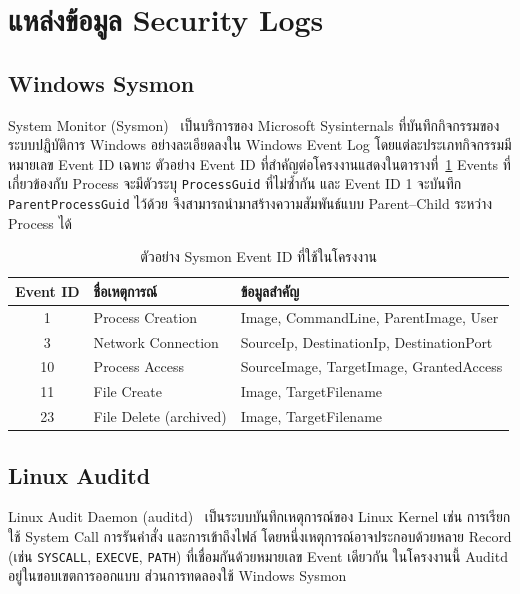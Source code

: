 \section{แหล่งข้อมูล Security Logs}

\subsection{Windows Sysmon}
System Monitor (Sysmon)~\cite{sysmon} เป็นบริการของ Microsoft Sysinternals
ที่บันทึกกิจกรรมของระบบปฏิบัติการ Windows อย่างละเอียดลงใน Windows Event Log
โดยแต่ละประเภทกิจกรรมมีหมายเลข Event ID เฉพาะ ตัวอย่าง Event ID ที่สำคัญต่อโครงงานแสดงในตารางที่~\ref{tab:sysmon-eid}
Events ที่เกี่ยวข้องกับ Process จะมีตัวระบุ \texttt{ProcessGuid} ที่ไม่ซ้ำกัน
และ Event ID 1 จะบันทึก \texttt{ParentProcessGuid} ไว้ด้วย
จึงสามารถนำมาสร้างความสัมพันธ์แบบ Parent--Child ระหว่าง Process ได้

\begin{table}[ht]
  \centering
  \caption{ตัวอย่าง Sysmon Event ID ที่ใช้ในโครงงาน}
  \label{tab:sysmon-eid}
  \begin{tabular}{|c|l|l|}
    \hline
    \textbf{Event ID} & \textbf{ชื่อเหตุการณ์} & \textbf{ข้อมูลสำคัญ} \\ \hline
    1  & Process Creation        & Image, CommandLine, ParentImage, User \\ \hline
    3  & Network Connection      & SourceIp, DestinationIp, DestinationPort \\ \hline
    10 & Process Access          & SourceImage, TargetImage, GrantedAccess \\ \hline
    11 & File Create             & Image, TargetFilename \\ \hline
    23 & File Delete (archived)  & Image, TargetFilename \\ \hline
  \end{tabular}
\end{table}

\subsection{Linux Auditd}
Linux Audit Daemon (auditd)~\cite{auditd} เป็นระบบบันทึกเหตุการณ์ของ Linux Kernel
เช่น การเรียกใช้ System Call การรันคำสั่ง และการเข้าถึงไฟล์
โดยหนึ่งเหตุการณ์อาจประกอบด้วยหลาย Record (เช่น \texttt{SYSCALL}, \texttt{EXECVE}, \texttt{PATH})
ที่เชื่อมกันด้วยหมายเลข Event เดียวกัน
ในโครงงานนี้ Auditd อยู่ในขอบเขตการออกแบบ ส่วนการทดลองใช้ Windows Sysmon

